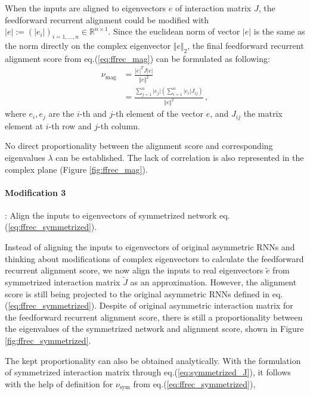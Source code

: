 \documentclass[11pt]{article}
\begin{document}
	When the inputs are aligned to eigenvectors $e$ of interaction matrix $J$, the feedforward recurrent alignment could be modified with $\vert e \vert := (\vert e_{i} \vert)_{i = 1, ..., n} \in \mathbb{R}^{n \times 1}$. Since the euclidean norm of vector $\vert e \vert$ is the same as the norm directly on the complex eigenvector $\Vert e \Vert_2$, the final feedforward recurrent alignment score from eq.(\ref{eq:ffrec_mag}) can be formulated as following:
		\begin{equation}
			\begin{split}
				\nu_{\text{mag}} & = \frac{\vert e \vert^T J \vert e \vert}{\Vert e \Vert^2} \\
				& = \frac{\sum_{j=1}^{n} \vert e_{j} \vert \left( \sum_{i = 1}^{n} \vert e_{i} \vert J_{ij} \right)}{\Vert e \Vert^2} \, ,
			\end{split}
		\end{equation}
	where $e_i, e_j$ are the $i$-th and $j$-th element of the vector $e$, and $J_{ij}$ the matrix element at $i$-th row and $j$-th column. 
	
	No direct proportionality between the alignment score and corresponding eigenvalues $\lambda$ can be established. The lack of correlation is also represented in the complex plane (Figure \ref{fig:ffrec_mag}). 
	\vspace{1cm}
	\paragraph{Modification 3}: Align the inputs to eigenvectors of symmetrized network eq.(\ref{eq:ffrec_symmetrized}).
	
	Instead of aligning the inputs to eigenvectors of original asymmetric RNNs and thinking about modifications of complex eigenvectors to calculate the feedforward recurrent alignment score, we now align the inputs to real eigenvectors $\tilde{e}$ from symmetrized interaction matrix $\tilde{J}$ as an approximation. However, the alignment score is still being projected to the original asymmetric RNNs defined in eq.(\ref{eq:ffrec_symmetrized}). 
	Despite of original asymmetric interaction matrix for the feedforward recurrent alignment score, there is still a proportionality between the eigenvalues of the symmetrized network and alignment score, shown in Figure \ref{fig:ffrec_symmetrized}. 
	
	The kept proportionality can also be obtained analytically. With the formulation of symmetrized interaction matrix through eq.(\ref{eq:symmetrized_J}), it follows with the help of definition for $\nu_{\text{sym}}$ from eq.(\ref{eq:ffrec_symmetrized}),
	
\end{document}
